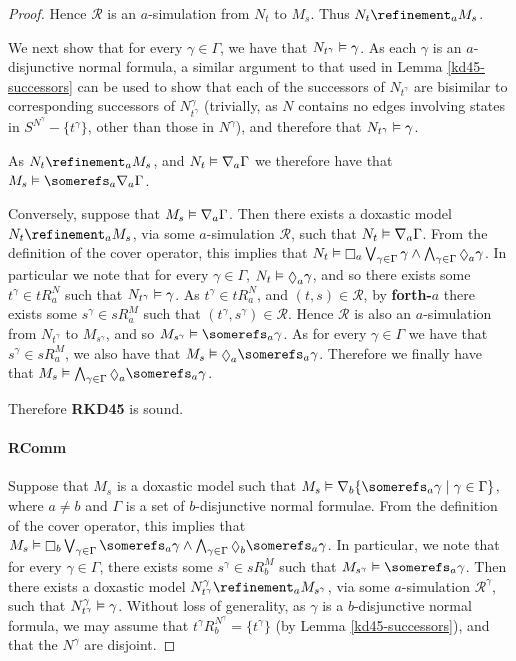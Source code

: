 \begin{proof}
Hence $\mathcal{R}$ is an $a$-simulation from $N_t$ to $M_s$. Thus $N_t
\refinement_a M_s$. 

We next show that for every $\gamma \in \Gamma$, we have that $N_{t^\gamma}
\vDash \gamma$. As each $\gamma$ is an $a$-disjunctive normal formula, a
similar argument to that used in Lemma \ref{kd45-successors} can be used to
show that each of the successors of $N_{t^\gamma}$ are bisimilar to
corresponding successors of $N^\gamma_{t^\gamma}$ (trivially, as $N$ contains
no edges involving states in $S^{N^\gamma} - \{t^\gamma\}$, other than those in
$N^\gamma$), and therefore that $N_{t^\gamma} \vDash \gamma$. 

As $N_t \refinement_a M_s$, and $N_t \vDash \nabla_a \Gamma$ we therefore
have that $M_s \entails \somerefs_a \covers_a \Gamma$.

Conversely, suppose that $M_s \vDash \nabla_a \Gamma$. Then there exists a
doxastic model $N_t \refinement_a M_s$, via some $a$-simulation $\mathcal{R}$,
such that $N_t \vDash \nabla_a \Gamma$. From the definition of the cover
operator, this implies that $N_t \entails \knows_a \bigvee_{\gamma \in \Gamma}
\gamma \land \bigwedge_{\gamma \in \Gamma} \suspects_a \gamma$. In particular we
note that for every $\gamma \in \Gamma$, $N_t \entails \suspects_a \gamma$, and
so there exists some $t^\gamma \in tR^N_a$ such that $N_{t^\gamma} \vDash
\gamma$. As $t^\gamma \in tR^N_a$, and $(t, s) \in \mathcal{R}$, by {\bf
forth-$a$} there exists some $s^\gamma \in sR^M_a$ such that $(t^\gamma, s^\gamma)
\in \mathcal{R}$. Hence $\mathcal{R}$ is also an $a$-simulation from
$N_{t^\gamma}$ to $M_{s^\gamma}$, and so $M_{s^\gamma} \entails \somerefs_a
\gamma$. As for every $\gamma \in \Gamma$ we have that $s^\gamma \in sR^M_a$, we
also have that $M_s \entails \suspects_a \somerefs_a \gamma$. Therefore we
finally have that $M_s \entails \bigwedge_{\gamma \in \Gamma} \suspects_a
\somerefs_a \gamma$.

Therefore {\bf RKD45} is sound.

\paragraph{RComm} 
Suppose that $M_s$ is a doxastic model such that $M_s \entails \covers_b \{
\somerefs_a \gamma \mid \gamma \in \Gamma\}$, where $a \ne b$ and $\Gamma$ is a
set of $b$-disjunctive normal formulae. From the definition of the cover
operator, this implies that $M_s \entails \knows_b \bigvee_{\gamma \in \Gamma}
\somerefs_a \gamma \land \bigwedge_{\gamma \in \Gamma} \suspects_b \somerefs_a
\gamma$. In particular, we note that for every $\gamma \in \Gamma$, there
exists some $s^\gamma \in sR^M_b$ such that $M_{s^\gamma} \entails \somerefs_a
\gamma$.  Then there exists a doxastic model $N^\gamma_{t^\gamma} \refinement_a
M_{s^\gamma}$, via some $a$-simulation $\mathcal{R}^\gamma$, such that
$N^\gamma_{t^\gamma} \vDash \gamma$. Without loss of generality, as $\gamma$
is a $b$-disjunctive normal formula, we may assume that $t^\gamma
R^{N^\gamma}_b = \{t^\gamma\}$ (by Lemma \ref{kd45-successors}), and that the
$N^\gamma$ are disjoint.


\end{proof}
